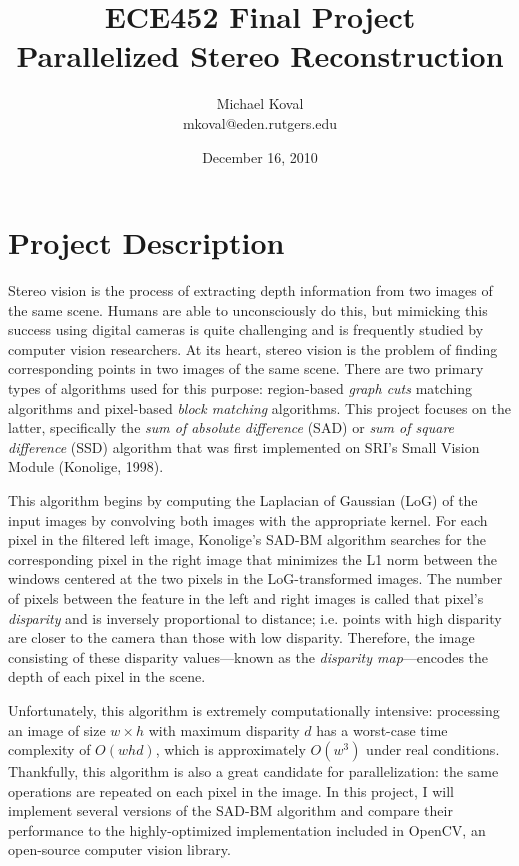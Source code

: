 \documentclass{article}
\title{
	\textbf{ECE452 Final Project} \\
	Parallelized Stereo Reconstruction
}
\author{
	Michael Koval \\
	mkoval@eden.rutgers.edu
}
\date{December 16, 2010}
\begin{document}
\maketitle

\section{Project Description}
Stereo vision is the process of extracting depth information from two images of
the same scene. Humans are able to unconsciously do this, but mimicking this
success using digital cameras is quite challenging and is frequently studied by
computer vision researchers. At its heart, stereo vision is the problem of
finding corresponding points in two images of the same scene. There are two
primary types of algorithms used for this purpose: region-based \textit{graph
cuts} matching algorithms and pixel-based \textit{block matching} algorithms.
This project focuses on the latter, specifically the \textit{sum of absolute
difference} (SAD) or \textit{sum of square difference} (SSD) algorithm that
was first implemented on SRI's Small Vision Module (Konolige, 1998).

This algorithm begins by computing the Laplacian of Gaussian (LoG) of the input
images by convolving both images with the appropriate kernel. For each pixel in
the filtered left image, Konolige's SAD-BM algorithm searches for the
corresponding pixel in the right image that minimizes the L1 norm between the
windows centered at the two pixels in the LoG-transformed images. The number of
pixels between the feature in the left and right images is called that pixel's
\textit{disparity} and is inversely proportional to distance; i.e. points with
high disparity are closer to the camera than those with low disparity.
Therefore, the image consisting of these disparity values---known as the
\textit{disparity map}---encodes the depth of each pixel in the scene.

Unfortunately, this algorithm is extremely computationally intensive:
processing an image of size $w \times h$ with maximum disparity $d$ has a
worst-case time complexity of $O(w h d)$, which is approximately $O(w^3)$ under
real conditions. Thankfully, this algorithm is also a great candidate for
parallelization: the same operations are repeated on each pixel in the image.
In this project, I will implement several versions of the SAD-BM algorithm and
compare their performance to the highly-optimized implementation included in
OpenCV, an open-source computer vision library.
\end{document}

